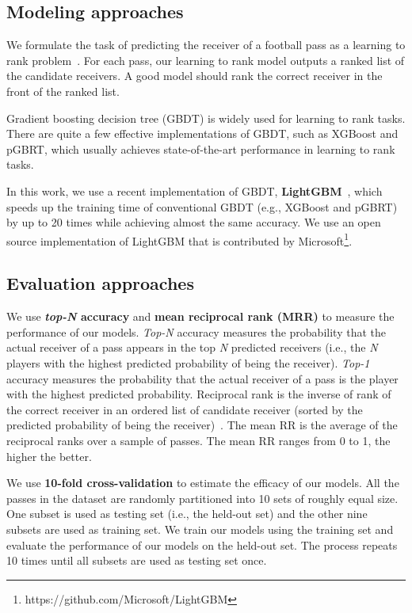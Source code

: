 \subsection{Modeling approaches}

We formulate the task of predicting the receiver of a football pass as a learning to rank problem~\cite{liu2009learning}. 
For each pass, our learning to rank model outputs a ranked list of the candidate receivers. 
A good model should rank the correct receiver in the front of the ranked list.

Gradient boosting decision tree (GBDT) is widely used for learning to rank tasks.
There are quite a few effective implementations of GBDT, such as XGBoost and pGBRT, which usually achieves state-of-the-art performance in learning to rank tasks.

In this work, we use a recent implementation of GBDT, \textbf{LightGBM}~\cite{NIPS2017_6907}, which speeds up the training time of conventional GBDT (e.g., XGBoost and pGBRT) by up to 20 times while achieving almost the same accuracy. 
We use an open source implementation of LightGBM that is contributed by Microsoft\footnote{https://github.com/Microsoft/LightGBM}.


\subsection{Evaluation approaches}

We use \textbf{\textit{top-N} accuracy} and \textbf{mean reciprocal rank (MRR)} to measure the performance of our models.
\textit{Top-N} accuracy measures the probability that the actual receiver of a pass appears in the top \textit{N} predicted receivers (i.e., the \textit{N} players with the highest predicted probability of being the receiver).
\textit{Top-1} accuracy measures the probability that the actual receiver of a pass is the player with the highest predicted probability.
Reciprocal rank is the inverse of rank of the correct receiver in an ordered list of candidate receiver (sorted by the predicted probability of being the receiver)~\cite{Craswell2009}.
The mean RR is the average of the reciprocal ranks over a sample of passes. The mean RR ranges from 0 to 1, the higher the better.
 
We use \textbf{10-fold cross-validation} to estimate the efficacy of our models. All the passes in the dataset are randomly partitioned into 10 sets of roughly equal size. One subset is used as testing set (i.e., the held-out set) and the other nine subsets are used as training set. 
We train our models using the training set and evaluate the performance of our models on the held-out set.
The process repeats 10 times until all subsets are used as testing set once.
